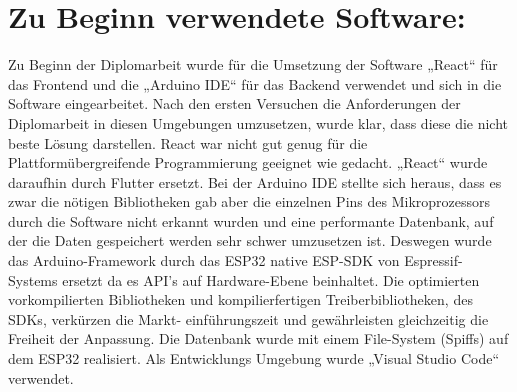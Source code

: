 \section{Zu Beginn verwendete Software:}
Zu Beginn der Diplomarbeit wurde für die Umsetzung der Software „React“ für das Frontend und die „Arduino IDE“ für das Backend verwendet und sich in die Software eingearbeitet. 
Nach den ersten Versuchen die Anforderungen der Diplomarbeit in diesen Umgebungen umzusetzen, wurde klar, dass diese die nicht beste Lösung darstellen. 
React war nicht gut genug für die Plattformübergreifende Programmierung geeignet wie gedacht. 
„React“ wurde daraufhin durch Flutter ersetzt. 
Bei der Arduino IDE stellte sich heraus, dass es zwar die nötigen Bibliotheken gab aber die einzelnen Pins des Mikroprozessors durch die Software nicht erkannt wurden und eine performante Datenbank, auf der die Daten gespeichert werden sehr schwer umzusetzen ist. 
Deswegen wurde das Arduino-Framework durch das ESP32 native ESP-SDK von Espressif-Systems ersetzt da es API’s auf Hardware-Ebene beinhaltet. 
Die optimierten vorkompilierten Bibliotheken und kompilierfertigen Treiberbibliotheken, des SDKs, verkürzen die Markt- einführungszeit und gewährleisten gleichzeitig die Freiheit der Anpassung. 
Die Datenbank wurde mit einem File-System (Spiffs) auf dem ESP32 realisiert. Als Entwicklungs Umgebung wurde „Visual Studio Code“ verwendet.

\newpage

